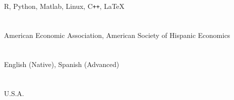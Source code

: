 \documentclass[margin, 11pt]{res} %
\begin{document}
\begin{resume}
\section{}
R, Python, Matlab, Linux, C\texttt{++}, \LaTeX \\
 
\section{}
American Economic Association, American Society of Hispanic Economics

\section{}
English (Native), Spanish (Advanced)

\section{}
U.S.A.\\





\section{}



\end{resume}
\end{document}
